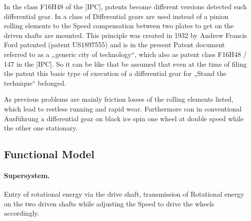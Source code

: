 \documentclass[11pt,a4paper]{article}
\begin{document}
In the class F16H48 of the [IPC], patents become different versions detected
such differential gear. In a class of Differential gears are used instead of a
pinion rolling elements to the Speed ​​compensation between two plates to get on
the driven shafts are mounted. This principle was created in 1932 by Andrew
Francis Ford patented (patent US1897555) and is in the present Patent document
referred to as a „generic city of technology“, which also as patent class
F16H48 / 147 in the [IPC]. So it can be like that be assumed that even at the
time of filing the patent this basic type of execution of a differential gear
for „Stand the technique“ belonged.

As previous problems are mainly friction losses of the rolling elements
listed, which lead to restless running and rapid wear. Furthermore can in
conventional Ausführung a differential gear on black ice spin one wheel at
double speed while the other one stationary.

\subsection{Functional Model}

\paragraph{Supersystem.}
Entry of rotational energy via the drive shaft, transmission of Rotational
energy on the two driven shafts while adjusting the Speed ​​to drive the wheels
accordingly.
\end{document}
